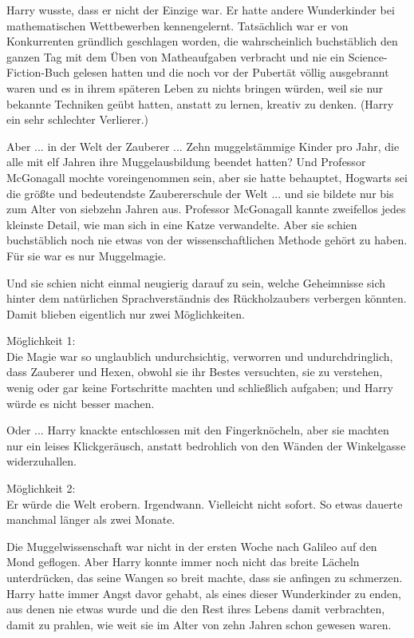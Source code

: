 Harry wusste, dass er nicht der Einzige war. Er hatte andere Wunderkinder bei
mathematischen Wettbewerben kennengelernt. Tatsächlich war er von Konkurrenten
gründlich geschlagen worden, die wahrscheinlich buchstäblich den ganzen Tag mit
dem Üben von Matheaufgaben verbracht und nie ein Science-Fiction-Buch gelesen
hatten und die noch vor der Pubertät völlig ausgebrannt waren und es in ihrem
späteren Leben zu nichts bringen würden, weil sie nur bekannte Techniken geübt
hatten, anstatt zu lernen, kreativ zu denken. (Harry ein sehr schlechter
Verlierer.)

Aber ... in der Welt der Zauberer ... Zehn muggelstämmige Kinder pro Jahr, die
alle mit elf Jahren ihre Muggelausbildung beendet hatten? Und Professor
McGonagall mochte voreingenommen sein, aber sie hatte behauptet, Hogwarts sei
die größte und bedeutendste Zaubererschule der Welt ... und sie bildete nur bis
zum Alter von siebzehn Jahren aus. Professor McGonagall kannte zweifellos jedes
kleinste Detail, wie man sich in eine Katze verwandelte. Aber sie schien
buchstäblich noch nie etwas von der wissenschaftlichen Methode gehört zu haben.
Für sie war es nur Muggelmagie.

Und sie schien nicht einmal neugierig darauf zu sein, welche Geheimnisse sich
hinter dem natürlichen Sprachverständnis des Rückholzaubers verbergen könnten.
Damit blieben eigentlich nur zwei Möglichkeiten.

Möglichkeit 1:\\
Die Magie war so unglaublich undurchsichtig, verworren und undurchdringlich,
dass Zauberer und Hexen, obwohl sie ihr Bestes versuchten, sie zu verstehen,
wenig oder gar keine Fortschritte machten und schließlich aufgaben; und Harry
würde es nicht besser machen.

Oder ... Harry knackte entschlossen mit den Fingerknöcheln, aber sie machten nur
ein leises Klickgeräusch, anstatt bedrohlich von den Wänden der Winkelgasse
widerzuhallen.

Möglichkeit 2:\\
Er würde die Welt erobern. Irgendwann. Vielleicht nicht sofort. So etwas dauerte
manchmal länger als zwei Monate.

Die Muggelwissenschaft war nicht in der ersten Woche nach Galileo auf den Mond
geflogen. Aber Harry konnte immer noch nicht das breite Lächeln unterdrücken,
das seine Wangen so breit machte, dass sie anfingen zu schmerzen. Harry hatte
immer Angst davor gehabt, als eines dieser Wunderkinder zu enden, aus denen nie
etwas wurde und die den Rest ihres Lebens damit verbrachten, damit zu prahlen,
wie weit sie im Alter von zehn Jahren schon gewesen waren.

